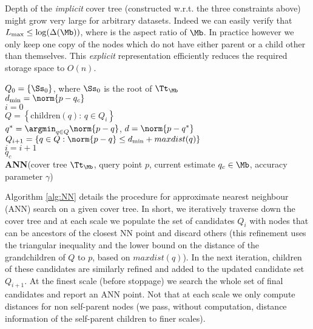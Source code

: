 Depth of the \emph{implicit} cover tree (constructed w.r.t. the three constraints above) might grow very large for arbitrary datasets. Indeed we can easily verify that $L_{\max}\leq \log(\Delta(\Mb))$, where 
is the aspect ratio of $\Mb$. In practice however we only keep one copy of the nodes which do not have either parent or a child other than themselves. This \emph{explicit} representation efficiently reduces the required storage space to $O(n)$. 

\begin{algorithm}[t]
	\label{alg:findNN}
	\SetAlgoLined
	$Q_0 = \{\Ss_0\}$, where $\Ss_0$ is the root of $\Tt_{\Mb}$\\
	$d_{\min}=\norm{p-q_c}$\\
	$i=0$\\
	{
		$Q=\left\{\text{children}(q):\, q\in Q_i \right\} $\\
		$q^* = \argmin_{q\in Q} \norm{p-q}$, \quad $d = \norm{p-q^*}$ \\
		$Q_{i+1} = \left\{q\in Q: \norm{p-q}\leq d_{\min} + maxdist(q) \right\}$\\
		$i  = i+1$\\
	}	
	\Return $q_c$\\%
	\caption{\label{alg:NN} \textbf{ANN}(cover tree $\Tt_\Mb$, query point $p$, current estimate $q_c \in \Mb$, accuracy parameter $\gamma$)}
\end{algorithm}

Algorithm \ref{alg:NN} details the procedure for approximate nearest neighbour (ANN) search on a given cover tree. 
In short, we iteratively traverse down the cover tree and at each scale we populate the set of candidates $Q_i$ with nodes that can be ancestors of the closest NN point and discard others (this refinement uses the triangular inequality and the lower bound on the distance of the grandchildren of $Q$ to $p$, based on  $maxdist(q)$). In the next iteration, children of these candidates are similarly refined and added to the updated candidate set $Q_{i+1}$. At the finest scale (before stoppage) we search the whole set of final candidates and report an ANN point. Not that at each scale we only compute distances for non self-parent nodes (we pass, without computation, distance information of the self-parent children to finer scales).

